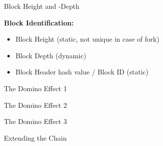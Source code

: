\documentclass[]{beamer}
\begin{document}
\begin{frame}{Block Height and -Depth}
	\begin{figure}
		
	\end{figure}
\textbf{Block Identification:}
	\begin{itemize}
 		\item Block Height (static, not unique in case of fork)
 		\item Block Depth (dynamic)
 		\item Block Header hash value / Block ID (static)
	\end{itemize}
\end{frame}


\begin{frame}{The Domino Effect 1}
	\begin{figure}
		
	\end{figure}
\end{frame}


\begin{frame}{The Domino Effect 2}
	\begin{figure}
		
	\end{figure}
\end{frame}


\begin{frame}{The Domino Effect 3}
	\begin{figure}
		
	\end{figure}
\end{frame}


\begin{frame}{Extending the Chain}
	\begin{figure}[h!]
	\center
		
	\end{figure}
\end{frame}

\end{document}

